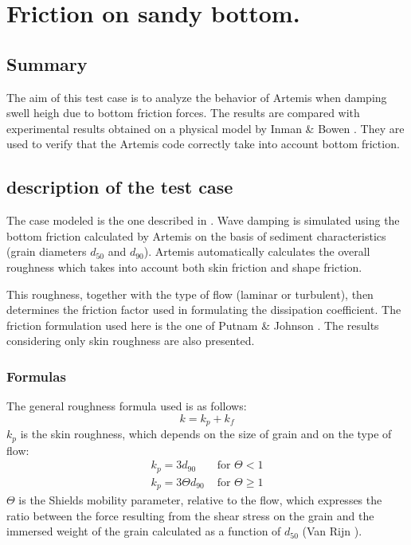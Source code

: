 \chapter{Friction on sandy bottom.}
\section{Summary}
The aim of this test case is to analyze the behavior of Artemis when damping
swell heigh due to bottom friction forces.
The results are compared with experimental results obtained on a physical
model by Inman \& Bowen \cite{Inman1962}. They are used to verify that the
Artemis code correctly take into account bottom friction.

\section{description of the test case}
The case modeled is the one described in \cite{Inman1962}. Wave damping is
simulated using the bottom friction calculated by Artemis on the basis of
sediment characteristics (grain diameters $d_{50}$ and $d_{90}$). Artemis automatically
calculates the overall roughness which takes into account both skin friction
and shape friction.

This roughness, together with the type of flow (laminar or turbulent),
then determines the friction factor used in formulating the dissipation
coefficient. The friction formulation used here is the one of Putnam \&
Johnson \cite{Putman1949}. The results considering only skin roughness are
also presented.


\subsection{Formulas}
The general roughness formula used is as follows:
$$
k = k_p + k_f
$$
$k_p$ is the skin roughness, which depends on the size of grain and on
the type of flow:
\begin{equation}
\begin{array}{ll} 
k_p = 3 d_{90} & \mbox{ for } \Theta < 1 \\[6pt]
k_p = 3 \Theta d_{90}  & \mbox{ for } \Theta \ge  1
\end{array}
\end{equation}
$\Theta$ is the Shields mobility parameter, relative to the flow, which
expresses the ratio between the force resulting from the shear stress on
the grain and the immersed weight of the grain calculated as a function of
$d_{50}$ (Van Rijn \cite{VanRijn1993}).


